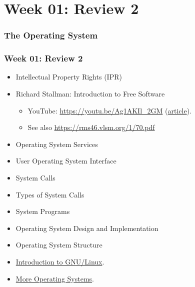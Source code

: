 \documentclass[xcolor=table, notheorems, hyperref={pdfpagelabels=false}]{beamer}
\begin{document}
\section{Week 01: Review 2}
\begin{frame}[fragile]
\frametitle{The Operating System}

\begin{table}
\end{table}
\end{frame}


\begin{frame}
\frametitle{Week 01: Review 2}

\begin{itemize}
\item Intellectual Property Rights (IPR)
\item Richard Stallman: Introduction to Free Software
\begin{itemize}
\item YouTube: \url{https://youtu.be/Ag1AKIl_2GM} 
      (\href{https://www.fsf.org/blogs/rms/20140407-geneva-tedx-talk-free-software-free-society}{article}).
\item See also \url{https://rms46.vlsm.org/1/70.pdf}
\end{itemize}
\item Operating System Services
\item User Operating System Interface
\item System Calls
\item Types of System Calls
\item System Programs
\item Operating System Design and Implementation
\item Operating System Structure
\item \href{https://osp4diss.vlsm.org/Welcome2GNULinux.html}{Introduction to GNU/Linux}.
\item \href{https://osp4diss.vlsm.org/osp-115.html}{More Operating Systems}.
\end{itemize}
\end{frame}
\end{document}
